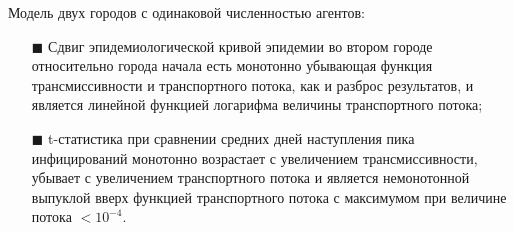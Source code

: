 \documentclass[a4paper,12pt]{article} %
\begin{document}
Модель двух городов с одинаковой численностью агентов:
\begin{itemize}
\item[$\blacksquare$] Сдвиг эпидемиологической кривой эпидемии во втором городе относительно города начала есть монотонно убывающая функция трансмиссивности и транспортного потока, как и разброс результатов, и является линейной функцией логарифма величины транспортного потока;
\item[$\blacksquare$] t-статистика при сравнении средних дней наступления пика инфицирований монотонно возрастает с увеличением трансмиссивности, убывает с увеличением транспортного потока и является немонотонной выпуклой вверх функцией транспортного потока с максимумом при величине потока $< 10^{-4}$.
\end{itemize}
\end{document}
